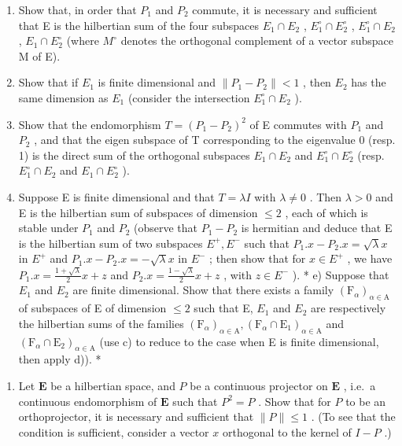 \begin{enumerate}
\def\labelenumi{\alph{enumi})}
\item
  Show that, in order that \(P_{1}\) and \(P_{2}\) commute, it is necessary and sufficient that E is the hilbertian sum of the four subspaces \(E_{1} \cap E_{2}\) , \(E_{1}^{\circ} \cap E_{2}^{\circ}\) , \(E_{1}^{\circ} \cap E_{2}\) , \(E_{1} \cap E_{2}^{\circ}\) (where \(M^{\circ}\) denotes the orthogonal complement of a vector subspace M of E).
\item
  Show that if \(E_{1}\) is finite dimensional and \(\|P_{1}-P_{2}\|<1\) , then \(E_{2}\) has the same dimension as \(E_{1}\) (consider the intersection \(E_{1}^{\circ}\cap E_{2}\) ).
\item
  Show that the endomorphism \(T=(P_{1}-P_{2})^{2}\) of E commutes with \(P_{1}\) and \(P_{2}\) , and that the eigen subspace of T corresponding to the eigenvalue 0 (resp. 1) is the direct sum of the orthogonal subspaces \(E_{1}\cap E_{2}\) and \(E_{1}^{\circ}\cap E_{2}^{\circ}\) (resp. \(E_{1}^{\circ}\cap E_{2}\) and \(E_{1}\cap E_{2}^{\circ}\) ).
\item
  Suppose E is finite dimensional and that \(T=\lambda I\) with \(\lambda\neq0\) . Then \(\lambda>0\) and E is the hilbertian sum of subspaces of dimension \(\leqslant2\) , each of which is stable under \(P_{1}\) and \(P_{2}\) (observe that \(P_{1}-P_{2}\) is hermitian and deduce that E is the hilbertian sum of two subspaces \(E^{+},E^{-}\) such that \(P_{1}.x-P_{2}.x=\sqrt{\lambda}x\) in \(E^{+}\) and \(P_{1}.x-P_{2}.x=-\sqrt{\lambda}x\) in \(E^{-}\) ; then show that for \(x\in E^{+}\) , we have \(P_{1}.x=\frac{1+\sqrt{\lambda}}{2}x+z\) and \(P_{2}.x=\frac{1-\sqrt{\lambda}}{2}x+z\) , with \(z\in E^{-}\) ). * e) Suppose that \(E_{1}\) and \(E_{2}\) are finite dimensional. Show that there exists a family \((\mathrm{F}_{\alpha})_{\alpha\in\mathrm{A}}\) of subspaces of E of dimension \(\leqslant2\) such that E, \(E_{1}\) and \(E_{2}\) are respectively the hilbertian sums of the families \((\mathrm{F}_{\alpha})_{\alpha\in\mathrm{A}},(\mathrm{F}_{\alpha}\cap\mathrm{E}_{1})_{\alpha\in\mathrm{A}}\) and \((\mathrm{F}_{\alpha}\cap\mathrm{E}_{2})_{\alpha\in\mathrm{A}}\) (use c) to reduce to the case when E is finite dimensional, then apply d)). *
\end{enumerate}

\begin{enumerate}
\def\labelenumi{\arabic{enumi})}
\setcounter{enumi}{15}
\tightlist
\item
  Let \(\mathbf{E}\) be a hilbertian space, and \(P\) be a continuous projector on \(\mathbf{E}\) , i.e.~a continuous endomorphism of \(\mathbf{E}\) such that \(P^2 = P\) . Show that for \(P\) to be an orthoprojector, it is necessary and sufficient that \(\| P \| \leqslant 1\) . (To see that the condition is sufficient, consider a vector \(x\) orthogonal to the kernel of \(I - P\) .)
\end{enumerate}

